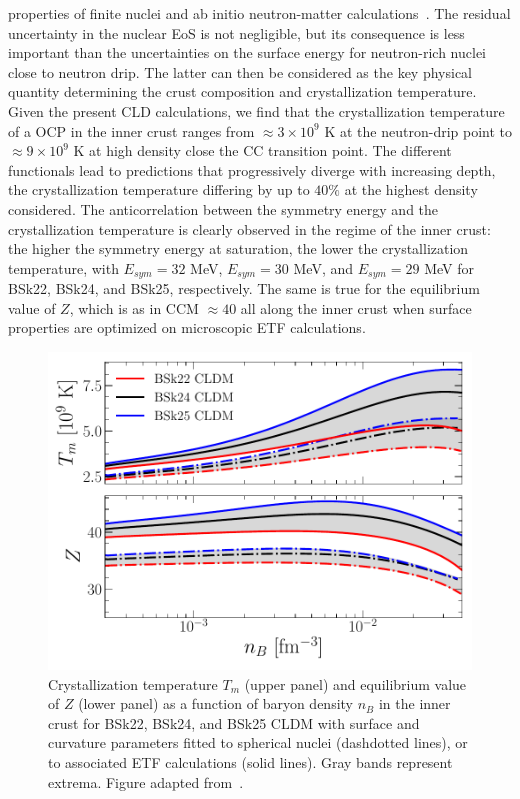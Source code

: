 properties of finite nuclei and ab initio neutron-matter 
calculations~\cite{Goriely2013}. The residual uncertainty in the nuclear EoS is 
not negligible, but its consequence is less important than the uncertainties on 
the surface energy for neutron-rich nuclei close to neutron drip. The latter 
can then be considered as the key physical quantity determining the crust 
composition and crystallization temperature.
%
Given the present CLD calculations, we find that the crystallization 
temperature of a OCP in the inner crust ranges from $\approx 3\times 10^9$ K at 
the neutron-drip point to $\approx 9\times 10^9$ K at high density close the CC 
transition point.
The different functionals lead to predictions that progressively diverge 
with increasing depth, the crystallization temperature differing by up to 
$40\%$ at the highest density considered.
The anticorrelation between the symmetry energy and the crystallization
temperature is clearly observed in the regime of the inner crust: the higher 
the symmetry energy at saturation, the lower the crystallization temperature, 
with $E_{sym}=32$ MeV, $E_{sym}=30$ MeV, and $E_{sym}=29$ MeV for BSk22, 
BSk24, and BSk25, respectively. The same is true for the equilibrium value of
$Z$, which is as in CCM $\approx 40$ all along the inner crust when 
surface properties are optimized on microscopic ETF calculations.
%
\begin{figure}[!t]
  \begin{center}
    \includegraphics[width=0.9\linewidth]{figures/tm_compo_final1.pdf}
  \end{center}
  \caption[Crystallization temperature and equilibrium value of $Z$ of the
  one-component plasma versus baryon density in the inner crust]{
    Crystallization temperature $T_m$ (upper panel) and
    equilibrium value of $Z$ (lower panel) as a function of baryon density 
    $n_B$ in the inner crust for BSk22, BSk24, and BSk25 CLDM with surface and
  curvature parameters fitted to spherical nuclei (dashdotted lines), or to
associated ETF calculations (solid lines). Gray bands represent extrema. Figure
adapted from~\cite{Carreau2019}.}\label{fig:tm_compo_final1}
\end{figure}
 
